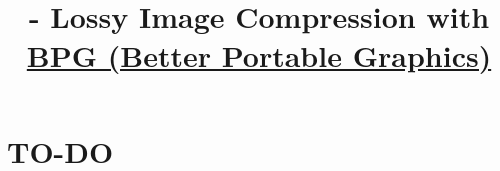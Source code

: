 

\title{\SM{} - Lossy Image Compression with \href{https://en.wikipedia.org/wiki/Better_Portable_Graphics}{BPG (Better Portable Graphics)}}

\maketitle
\tableofcontents

\section{TO-DO}
